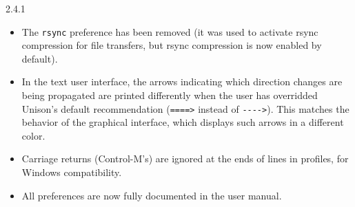 \begin{changesfromversion}{2.4.1}
\begin{itemize}
\item The \verb|rsync| preference has been removed (it was used to
activate rsync compression for file transfers, but rsync compression is
now enabled by default).
\item  In the text user interface, the arrows indicating which direction
changes are being
  propagated are printed differently when the user has overridded Unison's
  default recommendation (\verb|====>| instead of \verb|---->|).  This
  matches the behavior of the graphical interface, which displays such
  arrows in a different color.
\item Carriage returns (Control-M's) are ignored at the ends of lines in
  profiles, for Windows compatibility.
\item All preferences are now fully documented in the user manual.
\end{itemize}
\end{changesfromversion}

